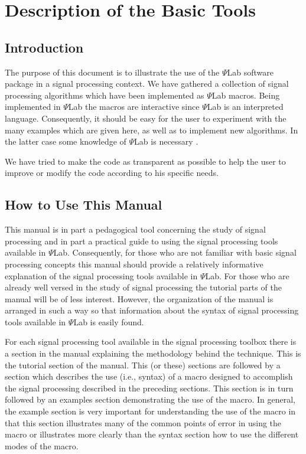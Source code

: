 \chapter{Description of the Basic Tools}

\section{Introduction}

The purpose of this document is to illustrate the use of the $\Psi$Lab software
package
in a signal processing context.
We have gathered a collection of signal processing 
algorithms which have been implemented 
as $\Psi$Lab macros.  Being implemented in $\Psi$Lab the macros are interactive
since $\Psi$Lab is an interpreted language.
Consequently, it should be easy for the user to experiment with
the many examples which are given here, as well as to implement new algorithms.
In the latter case some knowledge of $\Psi$Lab is necessary \cite{delebecque}.

We have tried to make the code as transparent as possible to help the user 
to improve or modify the code according to his specific needs.

\section{How to Use This Manual}

	This manual is in part a pedagogical tool concerning
the study of signal processing and in part a practical guide
to using the signal processing tools available in $\Psi$Lab.  Consequently,
for those who are not familiar with basic signal processing concepts
this manual should provide a relatively informative explanation of 
the signal processing tools available in $\Psi$Lab.  For those who
are already well versed in the study of signal processing the tutorial
parts of the manual will be of less interest.  However, the organization
of the manual is arranged in such a way so that information about
the syntax of signal processing tools available in $\Psi$Lab is easily found.

	For each signal processing tool available in the signal 
processing toolbox there is a section in the manual explaining the
methodology behind the technique.  This is the tutorial section of the
manual.  This (or these) sections are followed by a section which
describes the use (i.e., syntax) of a macro designed to accomplish
the signal processing described in the preceding sections.  This
section is in turn followed by an examples section demonstrating the
use of the macro.  In general, the example section is very important
for understanding the use of the macro in that this section illustrates
many of the common points of error in using the macro or illustrates
more clearly than the syntax section how to use the different modes
of the macro.

